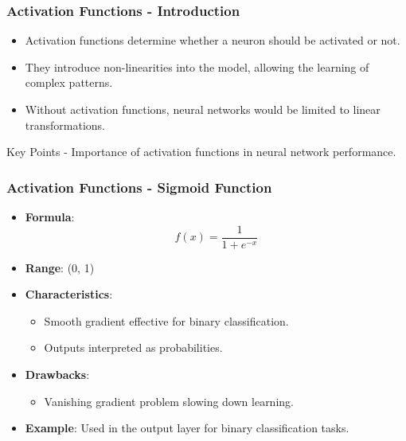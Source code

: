 \documentclass[aspectratio=169]{beamer}
\begin{document}
\begin{frame}[fragile]
    \frametitle{Activation Functions - Introduction}
    \begin{itemize}
        \item Activation functions determine whether a neuron should be activated or not.
        \item They introduce non-linearities into the model, allowing the learning of complex patterns.
        \item Without activation functions, neural networks would be limited to linear transformations.
    \end{itemize}
    \begin{block}{Key Points}
        - Importance of activation functions in neural network performance.
    \end{block}
\end{frame}

\begin{frame}[fragile]
    \frametitle{Activation Functions - Sigmoid Function}
    \begin{itemize}
        \item \textbf{Formula}:
        \begin{equation}
            f(x) = \frac{1}{1 + e^{-x}}
        \end{equation}
        \item \textbf{Range}: (0, 1)
        \item \textbf{Characteristics}:
        \begin{itemize}
            \item Smooth gradient effective for binary classification.
            \item Outputs interpreted as probabilities.
        \end{itemize}
        \item \textbf{Drawbacks}:
        \begin{itemize}
            \item Vanishing gradient problem slowing down learning.
        \end{itemize}
        \item \textbf{Example}: Used in the output layer for binary classification tasks.
    \end{itemize}
\end{frame}
\end{document}
